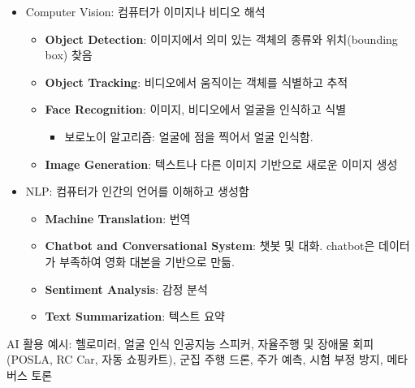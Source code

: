 \begin{itemize}
\item Computer Vision: 컴퓨터가 이미지나 비디오 해석
    \begin{itemize}
    \item \textbf{Object Detection}: 이미지에서 의미 있는 객체의 종류와 위치(bounding box) 찾음
    \item \textbf{Object Tracking}: 비디오에서 움직이는 객체를 식별하고 추적
    \item \textbf{Face Recognition}: 이미지, 비디오에서 얼굴을 인식하고 식별
        \begin{itemize}
        \item 보로노이 알고리즘: 얼굴에 점을 찍어서 얼굴 인식함.
        \end{itemize}
    \item \textbf{Image Generation}: 텍스트나 다른 이미지 기반으로 새로운 이미지 생성
    \end{itemize}
\item NLP: 컴퓨터가 인간의 언어를 이해하고 생성함
    \begin{itemize}
    \item \textbf{Machine Translation}: 번역
    \item \textbf{Chatbot and Conversational System}: 챗봇 및 대화. chatbot은 데이터가 부족하여 영화 대본을 기반으로 만듦.
    \item \textbf{Sentiment Analysis}: 감정 분석
    \item \textbf{Text Summarization}: 텍스트 요약
    \end{itemize}
\end{itemize}

AI 활용 예시: 헬로미러, 얼굴 인식 인공지능 스피커, 자율주행 및 장애물 회피(POSLA, RC Car, 자동 쇼핑카트), 군집 주행 드론, 주가 예측, 시험 부정 방지, 메타버스 토론
